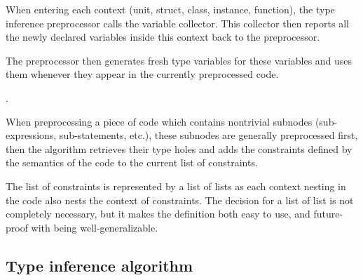\begin{defn}
    When entering each context (unit, struct, class, instance, function), the type inference preprocessor calls the variable collector. This collector then reports all the newly declared variables inside this context back to the preprocessor.
    
    The preprocessor then generates fresh type variables for these variables and uses them whenever they appear in the currently preprocessed code.

    .

    When preprocessing a piece of code which contains nontrivial subnodes (sub-expressions, sub-statements, etc.), these subnodes are generally preprocessed first, then the algorithm retrieves their type holes and adds the constraints defined by the semantics of the code to the current list of constraints.

    The list of constraints is represented by a list of lists as each context nesting in the code also nests the context of constraints. The decision for a list of list is not completely necessary, but it makes the definition both easy to use, and future-proof with being well-generalizable.
\end{defn}

\subsection{Type inference algorithm}

